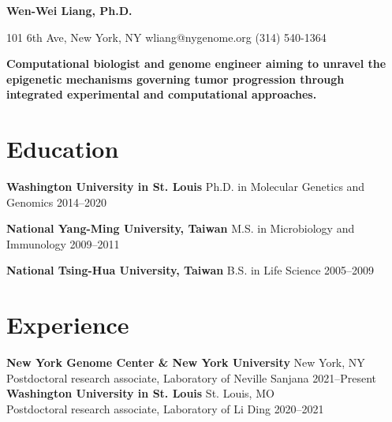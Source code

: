 \documentclass[letterpaper,11pt]{cv}
\begin{document}

\begin{minipage}[b][][c]{35em}
    \lightsourceserif\Huge\bfseries\color{color-title}
    Wen-Wei Liang, Ph.D.
\end{minipage}%
\hfill
\hspace{1em}
\begin{minipage}[b][][b]{11em}
    \raggedleft
    \small
    101 6th Ave, New York, NY \hfill
    {wliang@nygenome.org} \hfill
    (314) 540-1364
\end{minipage}

\vspace{2ex}

{
    \small\lightsourceserif\bfseries\color{color-title}
    Computational biologist and genome engineer aiming to unravel the epigenetic mechanisms governing tumor progression through integrated experimental and computational approaches.\par
}

\section{Education}

\begin{entrylist}

\item \textbf{Washington University in St. Louis} \hspace{2.45em} Ph.D. in Molecular Genetics and Genomics \hfill
    2014--2020

\item \textbf{National Yang-Ming University, Taiwan} \hspace{0.5em} M.S. in Microbiology and Immunology \hfill
    2009--2011

\item \textbf{National Tsing-Hua University, Taiwan} \hspace{0.72em} B.S. in Life Science \hfill
    2005--2009

\end{entrylist}

\section{Experience}
\textbf{New York Genome Center \& New York University}
\hfill New York, NY\\
Postdoctoral research associate, {Laboratory of Neville Sanjana } \hfill
2021--Present\\
\textbf{Washington University in St. Louis}
\hfill St. Louis, MO\\
Postdoctoral research associate, {Laboratory of Li Ding } \hfill
2020--2021
\end{document}
